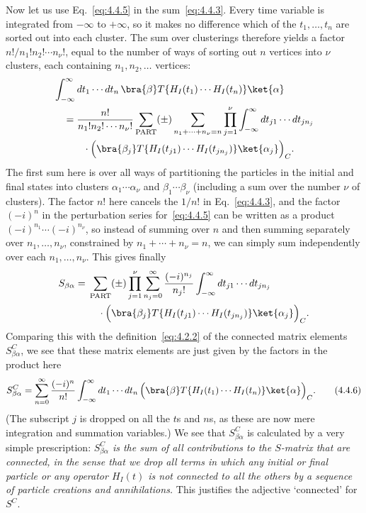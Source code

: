 Now let us use Eq.~\eqref{eq:4.4.5} in the sum~\eqref{eq:4.4.3}. Every time variable is integrated
from $-\infty$ to $+\infty$, so it makes no difference which of the
$t_1,\ldots,t_n$ are sorted out into each cluster. The sum over clusterings
therefore yields a factor $n!/n_1!n_2!\cdots n_\nu!$, equal to the number of
ways of sorting out $n$ vertices into $\nu$ clusters, each containing
$n_1,n_2,\ldots$ vertices:
\begin{align*}
&\int_{-\infty}^{\infty}dt_1\cdots dt_n\,
 \bra{\beta}T\{H_I(t_1)\cdots H_I(t_n)\}\ket{\alpha}
\\
&\quad={}
\frac{n!}{n_1!n_2!\cdots n_\nu!}
\sum_{\mathrm{PART}}(\pm)
\sum_{n_1+\cdots+n_\nu=n}
\prod_{j=1}^{\nu}\int_{-\infty}^{\infty}
 dt_{j1}\cdots dt_{jn_j}
\\
&\qquad\quad\cdot
 \Bigl(\bra{\beta_j}T\{H_I(t_{j1})\cdots H_I(t_{jn_j})\}
 \ket{\alpha_j}\Bigr)_C.
\end{align*}
The first sum here is over all ways of partitioning the particles in the initial
and final states into clusters $\alpha_1\cdots\alpha_\nu$ and
$\beta_1\cdots\beta_\nu$ (including a sum over the number $\nu$ of clusters).
The factor $n!$ here cancels the $1/n!$ in Eq.~\eqref{eq:4.4.3}, and the factor $(-i)^n$
in the perturbation series for~\eqref{eq:4.4.5} can be written as a product
$(-i)^{n_1}\cdots(-i)^{n_\nu}$, so instead of summing over $n$ and then summing
separately over $n_1,\ldots,n_\nu$, constrained by
$n_1+\cdots+n_\nu=n$, we can simply sum independently over each
$n_1,\ldots,n_\nu$. This gives finally
\begin{align*}
S_{\beta\alpha}
={}&\sum_{\mathrm{PART}}(\pm)\prod_{j=1}^{\nu}
 \sum_{n_j=0}^{\infty}\frac{(-i)^{n_j}}{n_j!}
 \int_{-\infty}^{\infty}dt_{j1}\cdots dt_{jn_j}
\\
&\quad\cdot
 \Bigl(\bra{\beta_j}T\{H_I(t_{j1})\cdots H_I(t_{jn_j})\}
 \ket{\alpha_j}\Bigr)_C.
\end{align*}
Comparing this with the definition~\eqref{eq:4.2.2} of the connected matrix elements
$S^C_{\beta\alpha}$, we see that these matrix elements are just given by the
factors in the product here
\begin{equation}
S^C_{\beta\alpha}=\sum_{n=0}^{\infty}\frac{(-i)^n}{n!}
 \int_{-\infty}^{\infty}dt_1\cdots dt_n\,
 \Bigl(\bra{\beta}T\{H_I(t_1)\cdots H_I(t_n)\}
 \ket{\alpha}\Bigr)_C.
\tag{4.4.6}
\label{eq:4.4.6}
\end{equation}
(The subscript $j$ is dropped on all the $t$s and $n$s, as these are now mere
integration and summation variables.) We see that $S^C_{\beta\alpha}$ is
calculated by a very simple prescription: \emph{$S^C_{\beta\alpha}$ is the sum
of all contributions to the $S$-matrix that are connected, in the sense that we
drop all terms in which any initial or final particle or any operator $H_I(t)$
is not connected to all the others by a sequence of particle creations and
annihilations.} This justifies the adjective `connected' for $S^C$.


